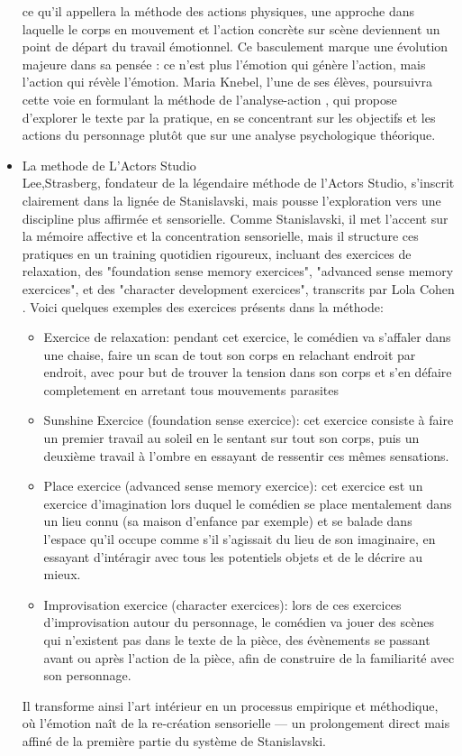 \begin{itemize}
    ce qu’il appellera la méthode des actions physiques, une approche dans laquelle le corps en mouvement et l’action concrète sur 
    scène deviennent un point de départ du travail émotionnel. Ce basculement marque une évolution majeure dans sa pensée : 
    ce n’est plus l’émotion qui génère l’action, mais l’action qui révèle l’émotion. Maria Knebel, l'une de ses élèves, poursuivra 
    cette voie en formulant la méthode de l’analyse-action \cite{knebel2006analyseaction}, qui propose d’explorer le texte par la 
    pratique, en se concentrant sur les objectifs et les actions du personnage plutôt que sur une analyse psychologique théorique.
    \item La methode de L'Actors Studio
    \\
    Lee,Strasberg, fondateur de la légendaire méthode de l’Actors Studio, s’inscrit clairement dans la lignée de Stanislavski,
    mais pousse l’exploration vers une discipline plus affirmée et sensorielle. Comme Stanislavski, il met l’accent sur la mémoire
    affective et la concentration sensorielle, mais il structure ces pratiques en un training quotidien rigoureux, incluant des exercices de 
    relaxation, des "foundation sense memory exercices", "advanced sense memory exercices", et des "character development exercices",
    transcrits par Lola Cohen \cite{cohen2016method}. 
    Voici quelques exemples des exercices présents dans la méthode:
    \begin{itemize}
        \item Exercice de relaxation: pendant cet exercice, le comédien va s'affaler dans une chaise, faire un scan de tout son corps 
        en relachant endroit par endroit, avec pour but de trouver la tension dans son corps et s'en défaire completement en arretant 
        tous mouvements parasites
        \item Sunshine Exercice (foundation sense exercice): cet exercice consiste à faire un premier travail au soleil en le sentant sur 
        tout son corps, puis un deuxième travail à l'ombre en essayant de ressentir ces mêmes sensations.  
        \item Place exercice (advanced sense memory exercice): cet exercice est un exercice d'imagination  lors duquel le comédien se
        place mentalement dans un lieu connu (sa maison d'enfance par exemple) et se balade dans l'espace qu'il occupe comme s'il s'agissait 
        du lieu de son imaginaire, en essayant d'intéragir avec tous les potentiels objets et de le décrire au mieux.
        \item  Improvisation exercice (character exercices): lors de ces exercices d'improvisation autour du personnage, le comédien va 
        jouer des scènes qui n'existent pas dans le texte de la pièce, des évènements se passant avant ou après l'action de la pièce, afin 
        de construire de la familiarité avec son personnage. 
    \end{itemize}
    Il transforme ainsi l’art intérieur en un processus empirique et méthodique, 
    où l’émotion naît de la re-création sensorielle — un prolongement direct mais affiné de la première partie du système de Stanislavski.
    
\end{itemize}

  




